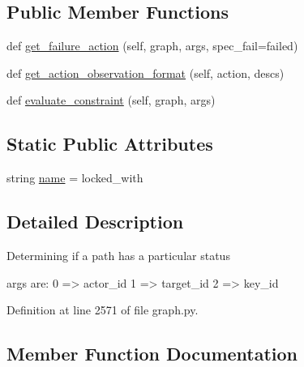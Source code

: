 \subsection*{Public Member Functions}
\begin{DoxyCompactItemize}
\item 
def \hyperlink{classlight__chats_1_1graph_1_1LockedWithConstraint_adf4e0502c0dea2fb13c19779c9f393c5}{get\+\_\+failure\+\_\+action} (self, graph, args, spec\+\_\+fail=\textquotesingle{}failed\textquotesingle{})
\item 
def \hyperlink{classlight__chats_1_1graph_1_1LockedWithConstraint_af7d3c8160d19a1e5ec2ce62d11b54882}{get\+\_\+action\+\_\+observation\+\_\+format} (self, action, descs)
\item 
def \hyperlink{classlight__chats_1_1graph_1_1LockedWithConstraint_a563e85b8f768c315556c077aa2aed7bf}{evaluate\+\_\+constraint} (self, graph, args)
\end{DoxyCompactItemize}
\subsection*{Static Public Attributes}
\begin{DoxyCompactItemize}
\item 
string \hyperlink{classlight__chats_1_1graph_1_1LockedWithConstraint_a461f74acc5853445a959b0bd17d61e4d}{name} = \textquotesingle{}locked\+\_\+with\textquotesingle{}
\end{DoxyCompactItemize}


\subsection{Detailed Description}
\begin{DoxyVerb}Determining if a path has a particular status

args are:
    0 => actor_id
    1 => target_id
    2 => key_id
\end{DoxyVerb}
 

Definition at line 2571 of file graph.\+py.



\subsection{Member Function Documentation}
\mbox{\label{classlight__chats_1_1graph_1_1LockedWithConstraint_a563e85b8f768c315556c077aa2aed7bf}} 

